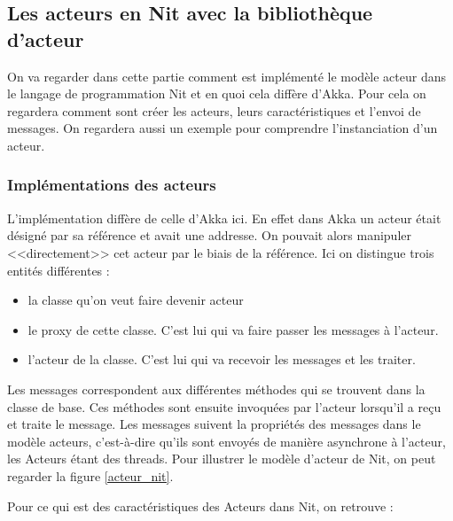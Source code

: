 \documentclass[11pt, a4paper]{article}
\begin{document}




\subsection{Les acteurs en Nit avec la bibliothèque d'acteur}
On va regarder dans cette partie comment est implémenté le modèle acteur dans le langage de programmation Nit et en quoi cela diffère d'Akka. Pour cela on regardera comment sont créer les acteurs, leurs caractéristiques et l'envoi de messages. On regardera aussi un exemple pour comprendre l’instanciation d'un acteur.

\subsubsection{Implémentations des acteurs}
L'implémentation diffère de celle d'Akka ici. En effet dans Akka un acteur était désigné par sa référence et avait une addresse. On pouvait alors manipuler <<directement>> cet acteur par le biais de la référence. Ici on distingue trois entités différentes :
\newline
\begin{itemize}
\item la classe qu'on veut faire devenir acteur
\item le proxy de cette classe. C'est lui qui va faire passer les messages à l'acteur.
\item l'acteur de la classe. C'est lui qui va recevoir les messages et les traiter.\\
\end{itemize}
\par 
Les messages correspondent aux différentes méthodes qui se trouvent dans la classe de base. Ces méthodes sont ensuite invoquées par l'acteur lorsqu'il a reçu et traite le message. Les messages suivent la propriétés des messages dans le modèle acteurs, c'est-à-dire qu'ils sont envoyés de manière asynchrone à l'acteur, les Acteurs étant des threads. Pour illustrer le modèle d'acteur de Nit, on peut regarder la figure \ref{acteur_nit}.
\par 
Pour ce qui est des caractéristiques des Acteurs dans Nit, on retrouve :
\end{document}
